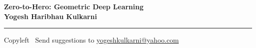 
\graphicspath{{images/}}

\footnotesize


\begin{center}
\Large{\textbf{Zero-to-Hero: Geometric Deep Learning\\ Yogesh Haribhau Kulkarni}}  
\end{center}

\begin{multicols}{2}

\end{multicols}

\rule{\linewidth}{0.25pt}
\scriptsize
Copyleft \textcopyleft\  Send suggestions to 
\href{http://www.yogeshkulkarni.com}{yogeshkulkarni@yahoo.com}


